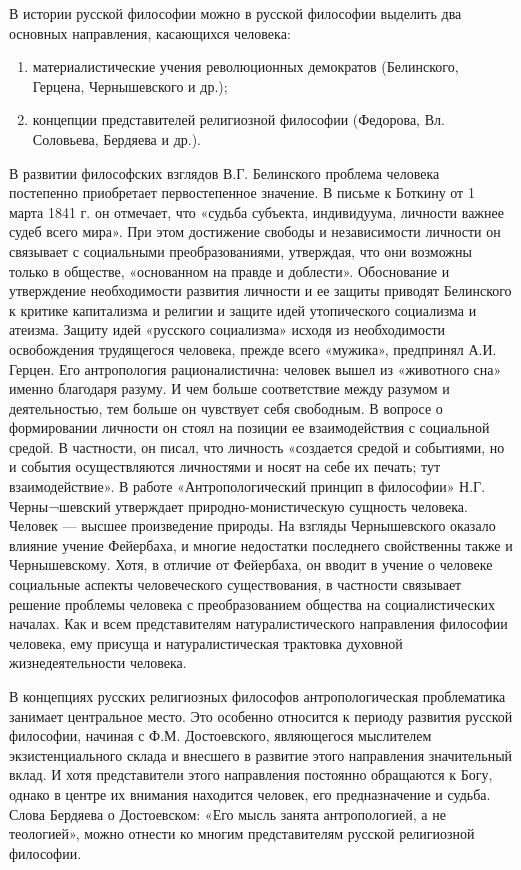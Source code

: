 \documentclass[12pt]{article}
\begin{document}
В истории русской философии можно в русской философии выделить два основных направления, касающихся
человека:
\begin{enumerate}
  \item материалистические учения революционных демократов (Белинского, Герцена, Чернышевского и др.);
  \item концепции представителей религиозной философии (Федорова, Вл. Соловьева, Бердяева и др.).
\end{enumerate}
В развитии философских взглядов В.Г. Белинского проблема человека постепенно приобретает первостепенное
значение. В письме к Боткину от 1 марта 1841 г. он отмечает, что «судьба субъекта, индивидуума, личности  
важнее  судеб  всего  мира».  При  этом  достижение  свободы  и  независимости  личности  он  связывает  с
социальными преобразованиями, утверждая, что они возможны только в обществе, «основанном на правде и
доблести». Обоснование и утверждение необходимости развития личности и ее защиты приводят Белинского к
критике капитализма и религии и защите идей утопического социализма и атеизма.
Защиту идей «русского социализма» исходя из необходимости освобождения трудящегося человека, прежде
всего «мужика», предпринял А.И. Герцен. Его антропология рационалистична: человек вышел из «животного
сна» именно благодаря разуму. И чем больше соответствие между разумом и деятельностью, тем больше он
чувствует себя свободным. В вопросе о формировании личности он стоял на позиции ее взаимодействия с
социальной  средой.  В  частности,  он  писал,  что  личность  «создается  средой  и  событиями,  но  и  события
осуществляются личностями и носят на себе их печать; тут взаимодействие».
В  работе  «Антропологический  принцип  в  философии»  Н.Г.  Черны¬шевский  утверждает  природно-монистическую сущность человека. Человек — высшее произведение природы. На взгляды Чернышевского
оказало влияние учение Фейербаха, и многие недостатки последнего свойственны также и Чернышевскому.
Хотя,  в  отличие  от  Фейербаха,  он  вводит  в  учение  о  человеке  социальные  аспекты  человеческого
существования,  в  частности  связывает  решение  проблемы  человека  с  преобразованием  общества  на
социалистических началах. Как и всем представителям натуралистического направления философии человека,
ему присуща и натуралистическая трактовка духовной жизнедеятельности человека.

В концепциях русских религиозных философов антропологическая проблематика занимает центральное место.
Это особенно относится к периоду развития русской философии, начиная с Ф.М. Достоевского, являющегося
мыслителем экзистенциального склада и внесшего в развитие этого направления значительный вклад. И хотя
представители  этого  направления  постоянно  обращаются  к  Богу,  однако  в  центре  их  внимания  находится
человек, его предназначение и судьба. Слова Бердяева о Достоевском: «Его мысль занята антропологией, а не
теологией», можно отнести ко многим представителям русской религиозной философии.
\end{document}

